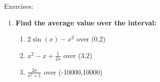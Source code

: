 \documentclass[../revisedmain.tex]{subfiles}
\begin{document}
	\newpage
	\begin{center}
		\LARGE Exercises:
	\end{center}
	\begin{enumerate}
		\item \textbf{Find the average value over the interval:}
		\begin{enumerate}
			\item $2\sin(x)-x^2$ over (0,2)
			\item $x^2-x+\frac{1}{2x}$ over (3,2)
			\item $\frac{2x}{x^2+1}$ over (-10000,10000)
		\end{enumerate}
	\end{enumerate}
\end{document}
